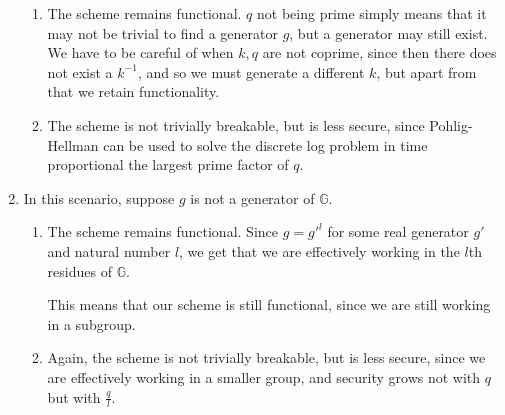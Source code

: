 \begin{enumerate}
        \begin{enumerate}
          \item
            The scheme remains functional. $q$ not being prime simply means that it may not be trivial to find a generator $g$, but a generator may still exist. We have to be careful of when $k,q$ are not coprime, since then there does not exist a $k^{-1}$, and so we must generate a different $k$, but apart from that we retain functionality.

          \item
            The scheme is not trivially breakable, but is less secure, since Pohlig-Hellman can be used to solve the discrete log problem in time proportional the largest prime factor of $q$.
        \end{enumerate}

      \item
        In this scenario, suppose $g$ is not a generator of $\mathbb{G}$.

        \begin{enumerate}
          \item
            The scheme remains functional. Since $g = g'^l$ for some real generator $g'$ and natural number $l$, we get that we are effectively working in the $l$th residues of $\mathbb{G}$.

            This means that our scheme is still functional, since we are still working in a subgroup.

          \item
            Again, the scheme is not trivially breakable, but is less secure, since we are effectively working in a smaller group, and security grows not with $q$ but with $\frac{q}{l}$.
        \end{enumerate}


        
    \end{enumerate}

